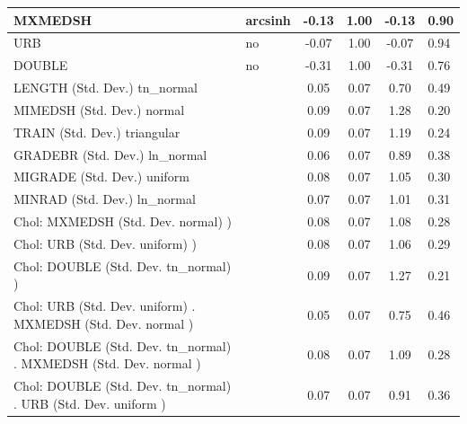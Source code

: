 \begin{table}
\begin{center}
\begin{tabular}{|l|l|c|c|c|l|}
			\hline
			MXMEDSH & arcsinh & -0.13 & 1.00 & -0.13 & 0.90 \\
			\hline
			URB & no & -0.07 & 1.00 & -0.07 & 0.94 \\
			\hline
			DOUBLE & no & -0.31 & 1.00 & -0.31 & 0.76 \\
			\hline
			LENGTH (Std. Dev.) tn_normal &  & 0.05 & 0.07 & 0.70 & 0.49 \\
			\hline
			MIMEDSH (Std. Dev.) normal &  & 0.09 & 0.07 & 1.28 & 0.20 \\
			\hline
			TRAIN (Std. Dev.) triangular &  & 0.09 & 0.07 & 1.19 & 0.24 \\
			\hline
			GRADEBR (Std. Dev.) ln_normal &  & 0.06 & 0.07 & 0.89 & 0.38 \\
			\hline
			MIGRADE (Std. Dev.) uniform &  & 0.08 & 0.07 & 1.05 & 0.30 \\
			\hline
			MINRAD (Std. Dev.) ln_normal &  & 0.07 & 0.07 & 1.01 & 0.31 \\
			\hline
			 Chol: MXMEDSH (Std. Dev. normal) ) &  & 0.08 & 0.07 & 1.08 & 0.28 \\
			\hline
			 Chol: URB (Std. Dev. uniform) ) &  & 0.08 & 0.07 & 1.06 & 0.29 \\
			\hline
			 Chol: DOUBLE (Std. Dev. tn_normal) ) &  & 0.09 & 0.07 & 1.27 & 0.21 \\
			\hline
			 Chol: URB (Std. Dev. uniform) . MXMEDSH (Std. Dev.   normal ) &  & 0.05 & 0.07 & 0.75 & 0.46 \\
			\hline
			 Chol: DOUBLE (Std. Dev. tn_normal) . MXMEDSH (Std. Dev.   normal ) &  & 0.08 & 0.07 & 1.09 & 0.28 \\
			\hline
			 Chol: DOUBLE (Std. Dev. tn_normal) . URB (Std. Dev.   uniform ) &  & 0.07 & 0.07 & 0.91 & 0.36 \\
			\hline
		\end{tabular}
	\end{center}
\end{table}